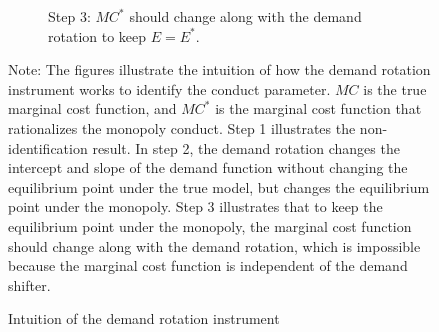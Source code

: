 \documentclass[11pt, a4paper]{article}
\theoremstyle{remark}
\begin{document}
\begin{figure}[p!]
\begin{center}
\begin{subfigure}[b]{0.5\textwidth}
            \caption{Step 3: $MC^{*}$ should change along with the demand rotation to keep $E = E^{*}$.}
            \label{fig:identification_example_step_3}
        \end{subfigure}
    \end{center}
    \caption{Intuition of the demand rotation instrument}
    \label{fig:identification_example}
    \vspace{2mm}
    \footnotesize
    Note: The figures illustrate the intuition of how the demand rotation instrument works to identify the conduct parameter.
    $MC$ is the true marginal cost function, and $MC^{*}$ is the marginal cost function that rationalizes the monopoly conduct.
    Step 1 illustrates the non-identification result.
    In step 2, the demand rotation changes the intercept and slope of the demand function without changing the equilibrium point under the true model, but changes the equilibrium point under the monopoly.
    Step 3 illustrates that to keep the equilibrium point under the monopoly, the marginal cost function should change along with the demand rotation, which is impossible because the marginal cost function is independent of the demand shifter.
\end{figure}
\end{document}
